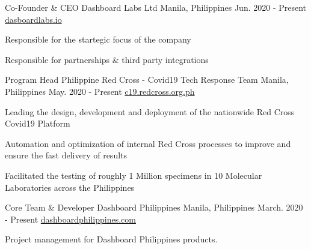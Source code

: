 
\begin{cventries}
  \cventry
    {Co-Founder \& CEO} %
    {Dashboard Labs Ltd} %
    {Manila, Philippines} %
    {Jun. 2020 - Present} %
    {\href{https://dashboardlabs.io}{dasboardlabs.io}} %
    {
      \begin{cvitems} %
      \item {Responsible for the startegic focus of the company}
      \item {Responsible for partnerships \& third party integrations}
      \end{cvitems}
    }
  \cventry
    {Program Head } %
    {Philippine Red Cross - Covid19 Tech Response Team} %
    {Manila, Philippines} %
    {May. 2020 - Present} %
    {\href{https://c19.redcross.org.ph}{c19.redcross.org.ph}} %
    {
      \begin{cvitems} %
      \item {Leading the design, development and deployment of the nationwide Red Cross Covid19 Platform}
      \item {Automation and optimization of internal Red Cross processes to improve and ensure the fast delivery of results}
      \item {Facilitated the testing of roughly 1 Million specimens in 10 Molecular Laboratories across the Philippines}
      \end{cvitems}
    }
  \cventry
    {Core Team \& Developer} %
    {Dashboard Philippines} %
    {Manila, Philippines} %
    {March. 2020 - Present} %
    {\href{https://dashboardphilippines.com}{dashboardphilippines.com}} %
    {
      \begin{cvitems} %
      \item {Project management for Dashboard Philippines products.}

\end{cvitems}}
\end{cventries}
